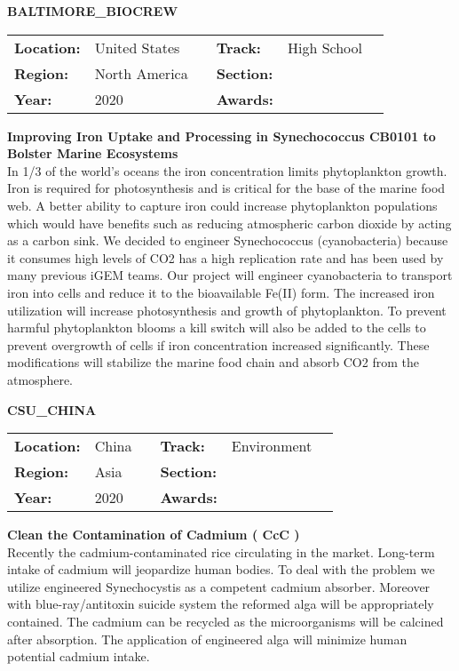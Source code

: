 \textbf{\uppercase{Baltimore\_BioCrew}} \FloatBarrier \begin{table}[h] \begin{tabular}{lp{2.5cm}llll} \textbf{Location:} & United States & \multicolumn{1}{|l}{} & \textbf{Track:}   & High School \\ \textbf{Region:}   & North America   & \multicolumn{1}{|l}{} & \textbf{Section:} &  \\ \textbf{Year:}     & 2020   & \multicolumn{1}{|l}{} & \textbf{Awards:}  & \end{tabular} \end{table} \FloatBarrier \noindent\textbf{Improving Iron Uptake and Processing in Synechococcus CB0101 to Bolster Marine Ecosystems} \vspace{.2cm}\\  In 1/3 of the world’s oceans the iron concentration limits phytoplankton growth. Iron is required for photosynthesis and is critical for the base of the marine food web. A better ability to capture iron could increase phytoplankton populations which would have benefits such as reducing atmospheric carbon dioxide by acting as a carbon sink. We decided to engineer Synechococcus (cyanobacteria) because it consumes high levels of CO2 has a high replication rate and has been used by many previous iGEM teams. Our project will engineer cyanobacteria to transport iron into cells and reduce it to the bioavailable Fe(II) form.  The increased iron utilization  will increase photosynthesis and growth of phytoplankton. To prevent harmful phytoplankton blooms a kill switch will also be added to the cells to prevent overgrowth of cells if iron concentration increased significantly. These modifications will stabilize the marine food chain and absorb CO2 from the atmosphere. 
\vspace{2cm}

\textbf{\uppercase{CSU\_CHINA}} \FloatBarrier \begin{table}[h] \begin{tabular}{lp{2.5cm}llll} \textbf{Location:} & China & \multicolumn{1}{|l}{} & \textbf{Track:}   & Environment \\ \textbf{Region:}   & Asia   & \multicolumn{1}{|l}{} & \textbf{Section:} &  \\ \textbf{Year:}     & 2020   & \multicolumn{1}{|l}{} & \textbf{Awards:}  & \end{tabular} \end{table} \FloatBarrier \noindent\textbf{Clean the Contamination of Cadmium ( CcC )} \vspace{.2cm}\\  Recently the cadmium-contaminated rice circulating in the market. Long-term intake of cadmium will jeopardize human bodies. To deal with the problem we utilize engineered Synechocystis as a competent cadmium absorber. Moreover with blue-ray/antitoxin suicide system the reformed alga will be appropriately contained. The cadmium can be recycled as the microorganisms will be calcined after absorption. The application of engineered alga will minimize human potential cadmium intake.
\vspace{2cm} $ $
\pagebreak

